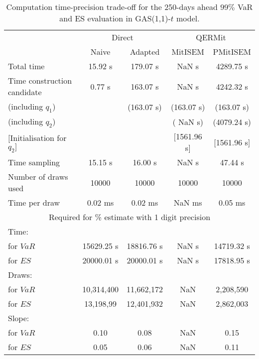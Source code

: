 { \renewcommand{\arraystretch}{1.3} 
\begin{table}[h] 
\centering 
\caption{Computation time-precision trade-off for the 250-days ahead  $99\%$ VaR and ES evaluation in GAS(1,1)-$t$ model.} 
\label{tab:time_precision_t_gas} 
\begin{tabular}{lcccc}  
  & \multicolumn{2}{c}{Direct} & \multicolumn{2}{c}{QERMit}  \\ \cline{2-5} 
  & Naive & Adapted & MitISEM & PMitISEM  \\ \hline 
Total time & 15.92 s & 179.07 s &  NaN s & 4289.75 s \\ 
Time construction candidate & 0.77 s & 163.07 s &  NaN s & 4242.32 s \\ 
 (including $q_{1}$) &   &  (163.07 s) & (163.07 s) & (163.07 s) \\ 
 (including $q_{2}$) &   &  & ( NaN s) & (4079.24 s) \\ 
$[$Initialisation for $q_{2}$$]$&   &   & $[$1561.96 s$]$ & $[$1561.96 s$]$ \\ 
Time sampling & 15.15 s & 16.00 s &  NaN s & 47.44 s  \\  
Number of draws used & 10000 & 10000 & 10000 & 10000 \\ 
Time per draw & 0.02 ms & 0.02 ms &  NaN ms & 0.05 ms \\ \hline 
\multicolumn{5}{c}{Required for \% estimate with 1 digit precision} \\ \hline 
Time: &  &  &   &  \\ 
\hspace{1cm} for $VaR$ & 15629.25 s & 18816.76 s &  NaN s & 14719.32 s \\ 
\hspace{1cm} for $ES$ & 20000.01 s & 20000.01 s &  NaN s & 17818.95 s \\ 
Draws: &  &  &   &  \\ 
\hspace{1cm} for $VaR$ & 10,314,400 & 11,662,172  & NaN  & 2,208,590  \\ 
\hspace{1cm} for $ES$ & 13,198,99 & 12,401,932  & NaN   & 2,862,003  \\ 
\hline 
Slope: &  &  &   &  \\ 
\hspace{1cm} for $VaR$ & 0.10 & 0.08  &  NaN  & 0.15  \\ 
\hspace{1cm} for $ES$ & 0.05 & 0.06  &  NaN   & 0.11  \\  \hline 
\end{tabular} 
\end{table} 
} 
